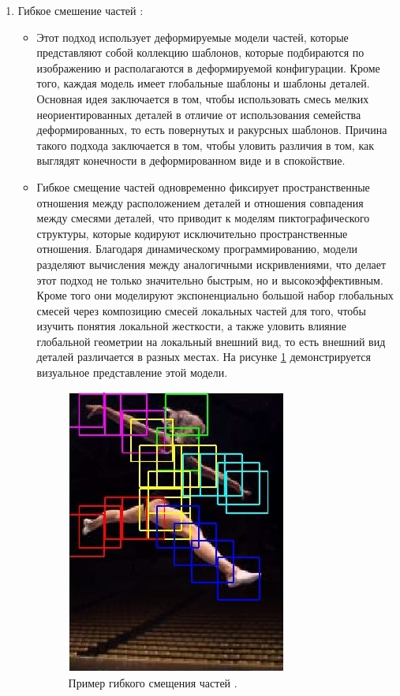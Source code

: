 \begin{enumerate}[label=\arabic*)]
 	\item Гибкое смешение частей \cite{FPE}:
 		
 		\begin{itemize}
 			\item Этот подход использует деформируемые модели частей, которые представляют собой коллекцию шаблонов, которые подбираются по изображению и располагаются в деформируемой конфигурации. 
 			Кроме того, каждая модель имеет глобальные шаблоны и шаблоны деталей. 
 			Основная идея заключается в том, чтобы использовать смесь мелких неориентированных деталей в отличие от использования семейства деформированных, то есть повернутых и ракурсных шаблонов.
 			Причина такого подхода заключается в том, чтобы уловить различия в том, как выглядят конечности в деформированном виде и в спокойствие.
 			
 			\item Гибкое смещение частей одновременно фиксирует пространственные отношения между расположением деталей и отношения совпадения между смесями деталей, что приводит к моделям пиктографического структуры, которые кодируют исключительно пространственные отношения. 
 			Благодаря динамическому программированию, модели разделяют вычисления между аналогичными искривлениями, что делает этот подход не только значительно быстрым, но и высокоэффективным.
 			Кроме того они моделируют экспоненциально большой набор глобальных смесей через композицию смесей локальных частей для того, чтобы изучить понятия локальной жесткости, а также уловить влияние глобальной геометрии на локальный внешний вид, то есть внешний вид деталей различается в разных местах. 
 			На рисунке \ref{img:fpe} демонстрируется визуальное представление этой модели.
 			
 			\begin{figure}[ht!]
 				\centering
 				\includegraphics[width=0.3\linewidth]{assets/fpe.jpeg}
 				\caption{Пример гибкого смещения частей \cite{FMPImage}.}
 				\label{img:fpe}
 			\end{figure}
 			

\end{itemize}
\end{enumerate}
